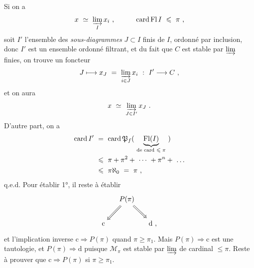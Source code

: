 
Si on a
\[ x \ \simeq \ \varinjlim_{I} x_i \ , \qquad\quad \operatorname{card} \operatorname{Fl} I \ \leqslant \ \pi \ , \]
soit $I'$ l'ensemble des \textit{sous-diagrammes} $J \subset I$ finis de $I$, ordonné par inclusion, donc $I'$ est un ensemble ordonné filtrant, et du fait que $C$ est stable par $\varinjlim$ finies, on trouve un foncteur
\[ J \longmapsto x_J \ = \ \varinjlim_{i\in J} x_i \ : \ I' \longrightarrow C \ , \]
et on aura
\[ x \ \simeq \ \varinjlim_{J\in I'} x_J \ . \]
D'autre part, on a
\[
\begin{aligned}
\card I' \ &= \ \card \mathfrak{P}_f( \ \underbrace{\Fl(I)}_{\text{de card $\leqslant \pi$}} \ ) \\
&\leqslant \ \pi + \pi^2 + \ \cdots \ + \pi^n + \ \dots \\
&\leqslant \ \pi\aleph_0 \ = \ \pi \ ,
\end{aligned}
\]
q.e.d. Pour établir 1°, il reste à établir
\[
\begin{tikzcd}[column sep=small]
& P(\pi) \arrow[dl, Rightarrow] \arrow[dr, Rightarrow] & \\
\mathrm{c} & & \mathrm{d} \text{ ,}
\end{tikzcd}
\]
et l'implication inverse $\mathrm{c} \Longrightarrow P(\pi)$ quand $\pi \geqslant \pi_1$. Mais $P(\pi) \Longrightarrow \mathrm{c}$ est une tautologie, et $P(\pi) \Longrightarrow \mathrm{d}$ puisque $\mathcal{M}_{\pi}$ est stable par $\varinjlim$ de cardinal $\leqslant \pi$. Reste à prouver que $\mathrm{c} \Longrightarrow P(\pi)$ si $\pi \geqslant \pi_1$.

